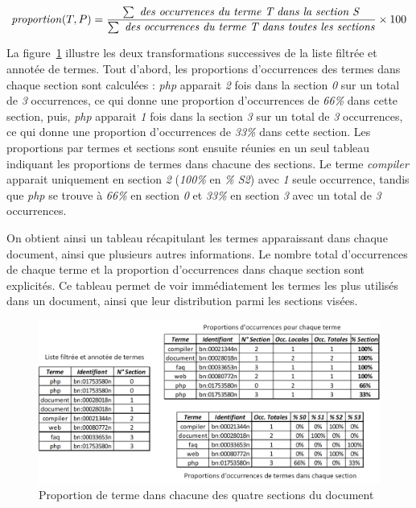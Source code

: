 \begin{equation}
\text{\textit{proportion}}(T, P) = \frac{\sum \text{ \textit{des occurrences du terme T dans la section S}}}{\sum \text{ \textit{des occurrences du terme T dans toutes les sections}}} \times 100
\label{equation:5-III-1-Calcul-Proportion-Termes}
\end{equation}


\medskip

La figure~\ref{figure:5-III-1-ProportionDocuments} illustre les deux transformations successives de la liste filtrée et annotée de termes.
Tout d'abord, les proportions d'occurrences des termes dans chaque section sont calculées : \textit{php} apparait \textit{2} fois dans la section \textit{0} sur un total de \textit{3} occurrences, ce qui donne une proportion d'occurrences de \textit{66\%} dans cette section, puis, \textit{php} apparait \textit{1} fois dans la section \textit{3} sur un total de \textit{3} occurrences, ce qui donne une proportion d'occurrences de \textit{33\%} dans cette section.
Les proportions par termes et sections sont ensuite réunies en un seul tableau indiquant les proportions de termes dans chacune des sections.
Le terme \textit{compiler} apparait uniquement en section \textit{2} (\textit{100\%} en \textit{\% S2}) avec \textit{1} seule occurrence, tandis que \textit{php} se trouve à \textit{66\%} en section \textit{0} et \textit{33\%} en section \textit{3} avec un total de \textit{3} occurrences.

\bigskip

On obtient ainsi un tableau récapitulant les termes apparaissant dans chaque document, ainsi que plusieurs autres informations.
Le nombre total d'occurrences de chaque terme et la proportion d'occurrences dans chaque section sont explicités.
Ce tableau permet de voir immédiatement les termes les plus utilisés dans un document, ainsi que leur distribution parmi les sections visées.

\hspace{0pt}
\vfill

\begin{figure}[ht]
\centering
\centerline{  %
\includegraphics[scale=0.8]{5-Conclusion/images/3-analyse-temporelle/exemple_proportion_documents.png}
}
\caption{Proportion de terme dans chacune des quatre sections du document}
\label{figure:5-III-1-ProportionDocuments}
\end{figure}


